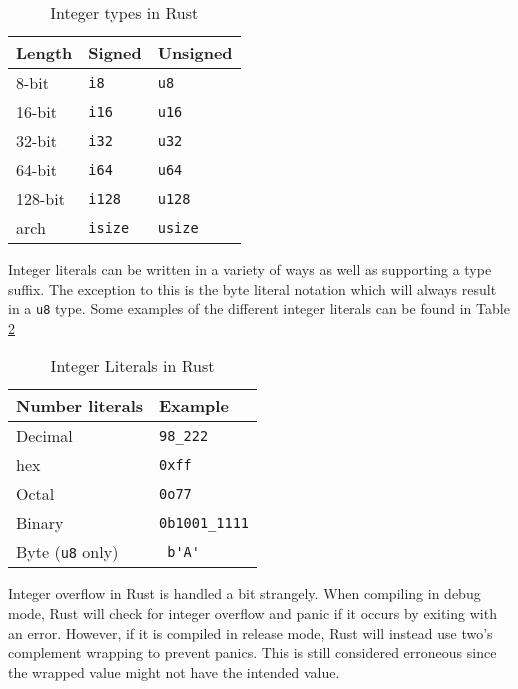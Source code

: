 \documentclass[12pt,notitlepage]{article}
\begin{document}
\begin{table}
    \centering
    \begin{tabular}{|l|l|l|}
        \hline
        \textbf{Length} & \textbf{Signed} & \textbf{Unsigned} \\
        \hline 
        8-bit & \lstinline[]$i8$ & \lstinline[]$u8$ \\
        16-bit & \lstinline[]$i16$ & \lstinline[]$u16$\\
        32-bit & \lstinline[]$i32$ & \lstinline[]$u32$\\
        64-bit & \lstinline[]$i64$ & \lstinline[]$u64$\\
        128-bit & \lstinline[]$i128$ & \lstinline[]$u128$\\
        arch & \lstinline[]$isize$ & \lstinline[]$usize$\\
        \hline
    \end{tabular}
    \caption{Integer types in Rust}
    \label{tab:int_types}
\end{table}

Integer literals can be written in a variety of ways as well as supporting a
type suffix. The exception to this is the byte literal notation which will
always result in a \lstinline{u8} type. Some examples of the different integer
literals can be found in Table \ref{tab:int_literals}

\begin{table}
    \centering
    \begin{tabular}{|l|l|}
        \hline
        \textbf{Number literals} & \textbf{Example} \\
        \hline
        Decimal & \lstinline[]$98_222$ \\
        hex & \lstinline[]$0xff$ \\
        Octal & \lstinline[]$0o77$ \\
        Binary & \lstinline[]$0b1001_1111$ \\
        Byte (\lstinline[]$u8$ only) & \lstinline[]$ b'A'$ \\
        \hline

    \end{tabular}
    \caption{Integer Literals in Rust}
    \label{tab:int_literals}
\end{table}

Integer overflow in Rust is handled a bit strangely. When compiling in debug
mode, Rust will check for integer overflow and panic if it occurs by exiting
with an error. However, if it is compiled in release mode, Rust will instead
use two's complement wrapping to prevent panics. This is still considered
erroneous since the wrapped value might not have the intended value.
\end{document}

